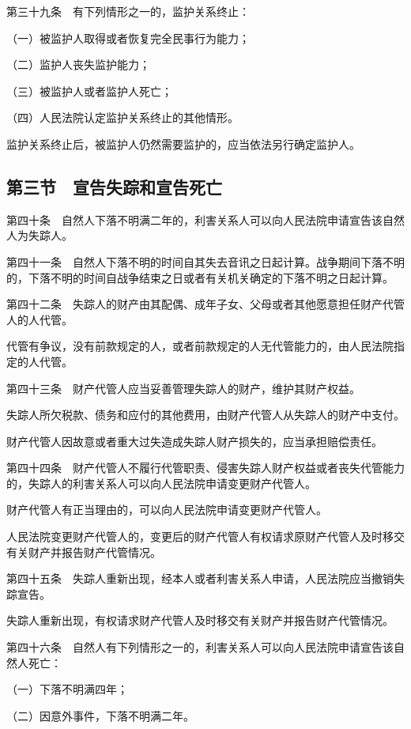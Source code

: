 \documentclass[UTF8,12pt,a4paper]{ctexbook}
\begin{document}
第三十九条　有下列情形之一的，监护关系终止：

（一）被监护人取得或者恢复完全民事行为能力；

（二）监护人丧失监护能力；

（三）被监护人或者监护人死亡；

（四）人民法院认定监护关系终止的其他情形。

监护关系终止后，被监护人仍然需要监护的，应当依法另行确定监护人。

\subsection*{第三节　宣告失踪和宣告死亡}

第四十条　自然人下落不明满二年的，利害关系人可以向人民法院申请宣告该自然人为失踪人。

第四十一条　自然人下落不明的时间自其失去音讯之日起计算。战争期间下落不明的，下落不明的时间自战争结束之日或者有关机关确定的下落不明之日起计算。

第四十二条　失踪人的财产由其配偶、成年子女、父母或者其他愿意担任财产代管人的人代管。

代管有争议，没有前款规定的人，或者前款规定的人无代管能力的，由人民法院指定的人代管。

第四十三条　财产代管人应当妥善管理失踪人的财产，维护其财产权益。

失踪人所欠税款、债务和应付的其他费用，由财产代管人从失踪人的财产中支付。

财产代管人因故意或者重大过失造成失踪人财产损失的，应当承担赔偿责任。

第四十四条　财产代管人不履行代管职责、侵害失踪人财产权益或者丧失代管能力的，失踪人的利害关系人可以向人民法院申请变更财产代管人。

财产代管人有正当理由的，可以向人民法院申请变更财产代管人。

人民法院变更财产代管人的，变更后的财产代管人有权请求原财产代管人及时移交有关财产并报告财产代管情况。

第四十五条　失踪人重新出现，经本人或者利害关系人申请，人民法院应当撤销失踪宣告。

失踪人重新出现，有权请求财产代管人及时移交有关财产并报告财产代管情况。

第四十六条　自然人有下列情形之一的，利害关系人可以向人民法院申请宣告该自然人死亡：

（一）下落不明满四年；

（二）因意外事件，下落不明满二年。
\end{document}
